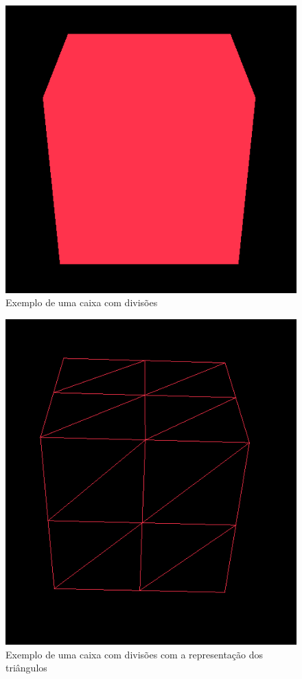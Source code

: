 \documentclass{article}
\begin{document}
\begin{figure}[H]
\centering\includegraphics[scale=0.45]{caixa1} 
\caption{\label{fig:controller}Exemplo de uma caixa com divisões}
\end{figure} \begin{figure}[H]
\centering\includegraphics[scale=0.45]{caixa} 
\caption{\label{fig:controller}Exemplo de uma caixa com divisões com a representação dos triângulos}
\end{figure}
\newpage
\end{document}
